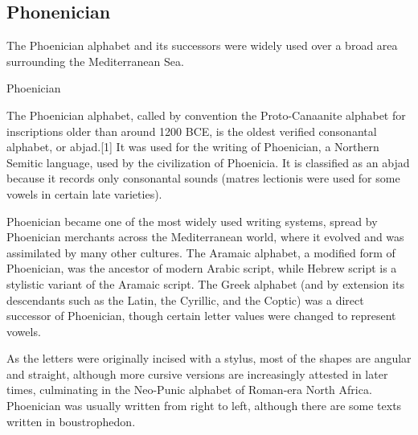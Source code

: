 \subsection{Phonenician}

The Phoenician alphabet and its successors were widely used over a broad area surrounding the Mediterranean Sea.

\let\phoenician\lycian

\begin{scriptexample}[]{Phoenician}



\end{scriptexample}

The Phoenician alphabet, called by convention the Proto-Canaanite alphabet for inscriptions older than around 1200 BCE, is the oldest verified consonantal alphabet, or abjad.[1] It was used for the writing of Phoenician, a Northern Semitic language, used by the civilization of Phoenicia. It is classified as an abjad because it records only consonantal sounds (matres lectionis were used for some vowels in certain late varieties).

Phoenician became one of the most widely used writing systems, spread by Phoenician merchants across the Mediterranean world, where it evolved and was assimilated by many other cultures. The Aramaic alphabet, a modified form of Phoenician, was the ancestor of modern Arabic script, while Hebrew script is a stylistic variant of the Aramaic script. The Greek alphabet (and by extension its descendants such as the Latin, the Cyrillic, and the Coptic) was a direct successor of Phoenician, though certain letter values were changed to represent vowels.

As the letters were originally incised with a stylus, most of the shapes are angular and straight, although more cursive versions are increasingly attested in later times, culminating in the Neo-Punic alphabet of Roman-era North Africa. Phoenician was usually written from right to left, although there are some texts written in boustrophedon.
